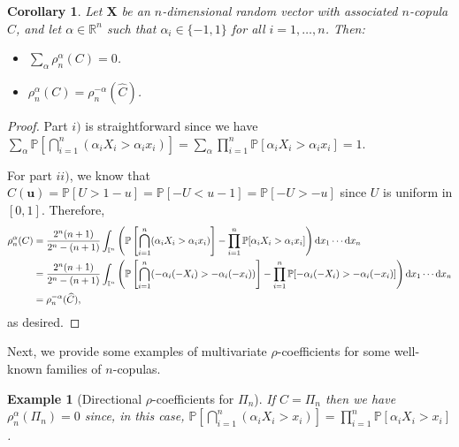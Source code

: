\documentclass[11pt,a4paper]{article}
\newtheorem{corollary}[theorem]{Corollary}
\newtheorem{example}{Example}
\def\XX{{\mathbf X}}
\def\uu{{\mathbf u}}
\begin{document}
\begin{corollary}
    Let $\XX$ be an $n$-dimensional random vector with associated $n$-copula $C$, and let $\alpha\in\mathbb{R}^n$ such that $\alpha_i\in\{-1,1\}$ for all $i=1,\ldots,n$. Then:
    \begin{itemize}
        \item [i)] $\sum_{\alpha}\rho_n^\alpha(C)=0$.  
        \item [ii)] $\rho_n^\alpha(C)=\rho_n^{-\alpha}(\widehat{C})$.
    \end{itemize}
\end{corollary}

\begin{proof}
    Part $i)$ is straightforward since we have $\sum_{\alpha}\mathbb{P}[\bigcap_{i=1}^n(\alpha_i X_i>\alpha_i x_i)]=\sum_{\alpha}\prod_{i=1}^n\mathbb{P}[\alpha_i X_i>\alpha_ix_i]=1$.
    
    For part $ii)$, we know that $\widehat{C}(\uu)=\mathbb{P}[U>1-u]=\mathbb{P}[-U<u-1]=\mathbb{P}[-U>-u]$ since $U$ is uniform in $[0,1]$. Therefore,
    \begin{align*}
        \rho_n^\alpha(C)&=\frac{2^n(n+1)}{2^n-(n+1)}\int_{\mathbb{I}^n}\left(\mathbb{P}\left[\bigcap_{i=1}^n(\alpha_iX_i>\alpha_ix_i)\right]-\prod_{i=1}^n\mathbb{P}[\alpha_iX_i>\alpha_ix_i]\right){\rm d}x_1\cdots {\rm d}x_n\\
        &=\frac{2^n(n+1)}{2^n-(n+1)}\int_{\mathbb{I}^n}\left(\mathbb{P}\left[\bigcap_{i=1}^n(-\alpha_i(-X_i)>-\alpha_i(-x_i))\right]-\prod_{i=1}^n\mathbb{P}[-\alpha_i(-X_i)>-\alpha_i(-x_i)]\right){\rm d}x_1\cdots {\rm d}x_n\\
        &=\rho_n^{-\alpha}(\widehat{C}),
    \end{align*}
    as desired.
\end{proof}

Next, we provide some examples of multivariate $\rho$-coefficients for some well-known families of $n$-copulas.

\begin{example}[Directional $\rho$-coefficients for $\Pi_n$]  If $C=\Pi_n$ then we have $\rho_n^\alpha(\Pi_n)=0$ since, in this case, $\mathbb{P}\left[\bigcap_{i=1}^n(\alpha_i X_i>x_i)\right]=\prod_{i=1}^n\mathbb{P}[\alpha_i X_i> x_i]$.
\end{example}
\end{document}
